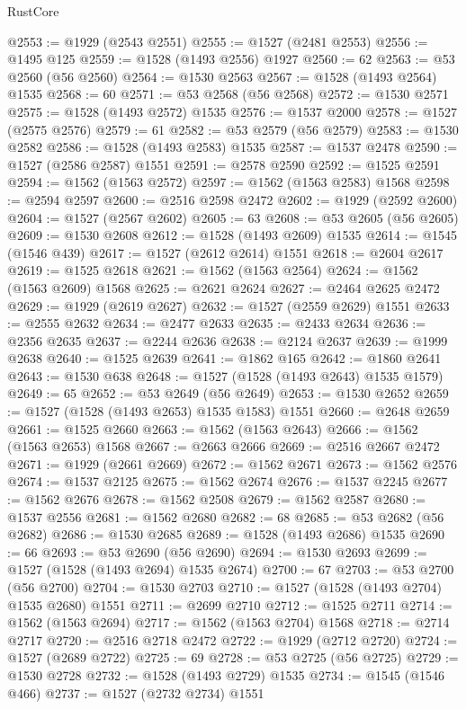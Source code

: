 \begin{lexlean}{RustCore}
\begin{coremodule}
@2553 := @1929 (@2543 @2551)
@2555 := @1527 (@2481 @2553)
@2556 := @1495 @125
@2559 := @1528 (@1493 @2556) @1927
@2560 := 62
@2563 := @53 @2560 (@56 @2560)
@2564 := @1530 @2563
@2567 := @1528 (@1493 @2564) @1535
@2568 := 60
@2571 := @53 @2568 (@56 @2568)
@2572 := @1530 @2571
@2575 := @1528 (@1493 @2572) @1535
@2576 := @1537 @2000
@2578 := @1527 (@2575 @2576)
@2579 := 61
@2582 := @53 @2579 (@56 @2579)
@2583 := @1530 @2582
@2586 := @1528 (@1493 @2583) @1535
@2587 := @1537 @2478
@2590 := @1527 (@2586 @2587) @1551
@2591 := @2578 @2590
@2592 := @1525 @2591
@2594 := @1562 (@1563 @2572)
@2597 := @1562 (@1563 @2583) @1568
@2598 := @2594 @2597
@2600 := @2516 @2598 @2472
@2602 := @1929 (@2592 @2600)
@2604 := @1527 (@2567 @2602)
@2605 := 63
@2608 := @53 @2605 (@56 @2605)
@2609 := @1530 @2608
@2612 := @1528 (@1493 @2609) @1535
@2614 := @1545 (@1546 @439)
@2617 := @1527 (@2612 @2614) @1551
@2618 := @2604 @2617
@2619 := @1525 @2618
@2621 := @1562 (@1563 @2564)
@2624 := @1562 (@1563 @2609) @1568
@2625 := @2621 @2624
@2627 := @2464 @2625 @2472
@2629 := @1929 (@2619 @2627)
@2632 := @1527 (@2559 @2629) @1551
@2633 := @2555 @2632
@2634 := @2477 @2633
@2635 := @2433 @2634
@2636 := @2356 @2635
@2637 := @2244 @2636
@2638 := @2124 @2637
@2639 := @1999 @2638
@2640 := @1525 @2639
@2641 := @1862 @165
@2642 := @1860 @2641
@2643 := @1530 @638
@2648 := @1527 (@1528 (@1493 @2643) @1535 @1579)
@2649 := 65
@2652 := @53 @2649 (@56 @2649)
@2653 := @1530 @2652
@2659 := @1527 (@1528 (@1493 @2653) @1535 @1583) @1551
@2660 := @2648 @2659
@2661 := @1525 @2660
@2663 := @1562 (@1563 @2643)
@2666 := @1562 (@1563 @2653) @1568
@2667 := @2663 @2666
@2669 := @2516 @2667 @2472
@2671 := @1929 (@2661 @2669)
@2672 := @1562 @2671
@2673 := @1562 @2576
@2674 := @1537 @2125
@2675 := @1562 @2674
@2676 := @1537 @2245
@2677 := @1562 @2676
@2678 := @1562 @2508
@2679 := @1562 @2587
@2680 := @1537 @2556
@2681 := @1562 @2680
@2682 := 68
@2685 := @53 @2682 (@56 @2682)
@2686 := @1530 @2685
@2689 := @1528 (@1493 @2686) @1535
@2690 := 66
@2693 := @53 @2690 (@56 @2690)
@2694 := @1530 @2693
@2699 := @1527 (@1528 (@1493 @2694) @1535 @2674)
@2700 := 67
@2703 := @53 @2700 (@56 @2700)
@2704 := @1530 @2703
@2710 := @1527 (@1528 (@1493 @2704) @1535 @2680) @1551
@2711 := @2699 @2710
@2712 := @1525 @2711
@2714 := @1562 (@1563 @2694)
@2717 := @1562 (@1563 @2704) @1568
@2718 := @2714 @2717
@2720 := @2516 @2718 @2472
@2722 := @1929 (@2712 @2720)
@2724 := @1527 (@2689 @2722)
@2725 := 69
@2728 := @53 @2725 (@56 @2725)
@2729 := @1530 @2728
@2732 := @1528 (@1493 @2729) @1535
@2734 := @1545 (@1546 @466)
@2737 := @1527 (@2732 @2734) @1551

\end{coremodule}
\end{lexlean}
